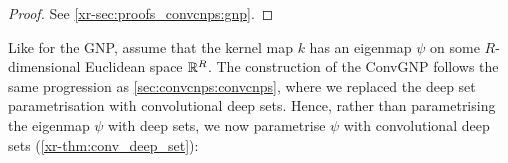 \documentclass[12pt]{report}
\newcommand{\xrprefix}[1]{xr-#1}
\begin{document}
\begin{proof}
    See \cref{\xrprefix{sec:proofs_convcnps:gnp}}.
\end{proof}


Like for the GNP, assume that the kernel map $k$ has an eigenmap $\psi$ on some $R$-dimensional Euclidean space $\mathbb{R}^R$.
The construction of the ConvGNP follows the same progression as \cref{sec:convcnps:convcnps}, where we replaced the deep set parametrisation with convolutional deep sets.
Hence, rather than parametrising the eigenmap $\psi$ with deep sets, we now parametrise $\psi$ with convolutional deep sets (\cref{\xrprefix{thm:conv_deep_set}}):
\end{document}
